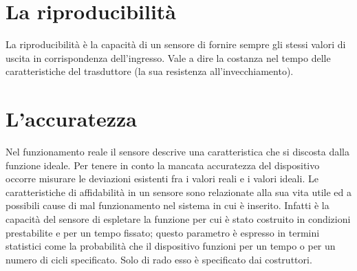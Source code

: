 \documentclass[a4paper,12pt]{article}
\begin{document}
\section{La riproducibilità}
La riproducibilità è la capacità di un sensore di fornire sempre gli stessi valori di uscita in corrispondenza dell'ingresso. Vale a dire la costanza nel tempo delle caratteristiche del trasduttore (la sua resistenza all'invecchiamento).

\section{L'accuratezza}
Nel funzionamento reale il sensore descrive una caratteristica che si discosta dalla funzione ideale. Per tenere in conto la mancata accuratezza del dispositivo occorre misurare le deviazioni esistenti fra i valori reali e i valori ideali. Le caratteristiche di affidabilità in un sensore sono relazionate alla sua vita utile ed a possibili cause di mal funzionamento nel sistema in cui è inserito. Infatti  è la capacità del sensore di espletare la funzione per cui è stato costruito in condizioni prestabilite e per un tempo fissato; questo parametro è espresso in termini statistici come la probabilità che il dispositivo funzioni per un tempo o per un numero di cicli specificato. Solo di rado esso è specificato dai costruttori.
\end{document}
